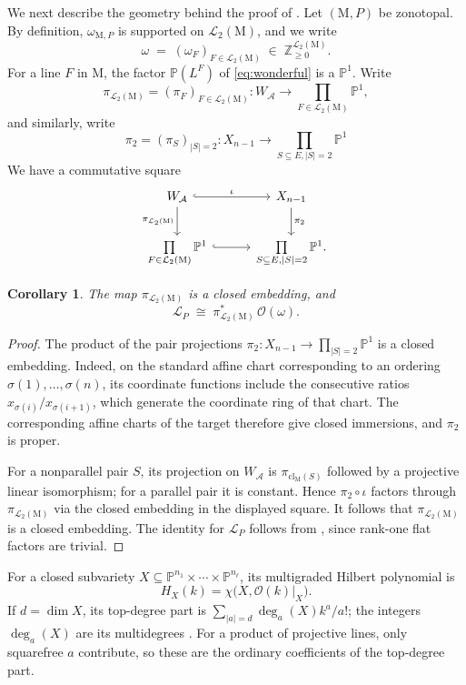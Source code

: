 \documentclass[11pt,a4paper,reqno]{amsart}
\theoremstyle{results}
\newtheorem{corollary}[thm]{Corollary}
\theoremstyle{definitions}
\def\Z{\mathbb{Z}}
\def\P{\mathbb{P}}
\def\Z{\mathbb{Z}}
\def\calA{\mathcal{A}}
\newcommand{\abs}[1]{\left\lvert#1\right\rvert}
\newcommand{\cl}{\textrm{cl}}
\newcommand{\M}{\mathrm{M}}
\newcommand{\cL}{\mathcal{L}}
\newcommand{\cO}{\mathcal{O}}
\newcommand{\Lines}{\mathcal{L}_2}
\begin{document}
We next describe the geometry behind the proof of .
Let $(\M, P)$ be zonotopal. By definition, $\omega_{\M, P}$ is supported on $\Lines(\M)$, and we write
\[
  \omega \;=\; (\omega_F)_{F \in \Lines(\M)} \;\in\; \Z_{\geqslant 0}^{\Lines(\M)} .
\]  For a line $F$ in $\M$, the factor $\P(L^F)$ of \eqref{eq:wonderful} is a $\P^1$. Write
\[
  \pi_{\Lines(\M)} = (\pi_F)_{F \in \Lines(\M)} \colon W_{\calA} \longrightarrow
  \prod_{F \in \Lines(\M)} \P^1 ,
\]
and similarly, write
\[
\pi_2 = (\pi_S)_{\abs{S} = 2} \colon X_{n-1} \to \prod_{S \subseteq E, \abs{S} = 2}\P^1
\]
We have a commutative square
\[
  \begin{tikzcd}[row sep=2.2em, column sep=3em]
    W_{\calA} \arrow[r, hook, "\iota"] \arrow[d, "\pi_{\Lines(\M)}"'] & X_{n-1} \arrow[d, "\pi_2"] \\
    \prod\limits_{F \in \Lines(\M)} \P^1 \arrow[r, hook] & \prod\limits_{S \subseteq E, \abs{S} = 2} \P^1 .
  \end{tikzcd}
\]

\begin{corollary}\label{cor:embedding}
  The map $\pi_{\Lines(\M)}$ is a closed embedding, and
  \[
    \cL_P \;\cong\; \pi_{\Lines(\M)}^{*}\,\cO(\omega) .
  \]
\end{corollary}

\begin{proof}
  The product of the pair projections
  $\pi_2\colon X_{n-1}\to\prod_{|S|=2}\P^1$ is a closed embedding.
  Indeed, on the standard affine chart corresponding to an ordering
  $\sigma(1),\ldots,\sigma(n)$, its coordinate functions include the
  consecutive ratios $x_{\sigma(i)}/x_{\sigma(i+1)}$, which generate
  the coordinate ring of that chart. The corresponding affine charts
  of the target therefore give closed immersions, and $\pi_2$ is proper.

  For a nonparallel pair $S$, its projection on $W_{\calA}$ is
  $\pi_{\cl_{\M}(S)}$ followed by a projective linear isomorphism;
  for a parallel pair it is constant. Hence $\pi_2\circ\iota$ factors
  through $\pi_{\Lines(\M)}$ via the closed embedding in the displayed
  square. It follows that $\pi_{\Lines(\M)}$ is a closed embedding.
  The identity for $\cL_P$ follows from , since
  rank-one flat factors are trivial.
\end{proof}


For a closed subvariety $X\subseteq\P^{n_1}\times\cdots\times\P^{n_\ell}$,
its multigraded Hilbert polynomial is
\[
  H_X(k)=\chi\big(X,\cO(k)|_X\big).
\]
If $d=\dim X$, its top-degree part is
$\sum_{|a|=d}\deg_a(X)k^a/a!$; the integers $\deg_a(X)$ are its
multidegrees \cite[Definition 2.7]{castillo2020when}. For a product of
projective lines, only squarefree $a$ contribute, so these are the ordinary
coefficients of the top-degree part.
\end{document}
